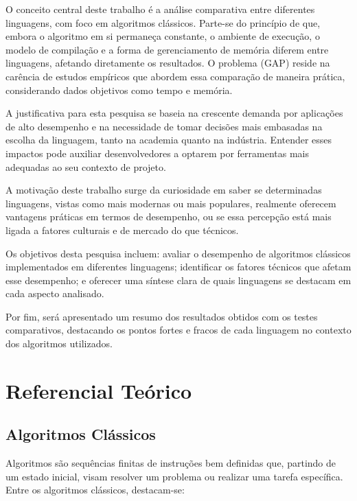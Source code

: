 \documentclass[12pt,oneside,a4paper]{report}
\begin{document}
O conceito central deste trabalho é a análise comparativa entre diferentes linguagens, com foco em algoritmos clássicos. Parte-se do princípio de que, embora o algoritmo em si permaneça constante, o ambiente de execução, o modelo de compilação e a forma de gerenciamento de memória diferem entre linguagens, afetando diretamente os resultados. O problema (GAP) reside na carência de estudos empíricos que abordem essa comparação de maneira prática, considerando dados objetivos como tempo e memória.

A justificativa para esta pesquisa se baseia na crescente demanda por aplicações de alto desempenho e na necessidade de tomar decisões mais embasadas na escolha da linguagem, tanto na academia quanto na indústria. Entender esses impactos pode auxiliar desenvolvedores a optarem por ferramentas mais adequadas ao seu contexto de projeto.

A motivação deste trabalho surge da curiosidade em saber se determinadas linguagens, vistas como mais modernas ou mais populares, realmente oferecem vantagens práticas em termos de desempenho, ou se essa percepção está mais ligada a fatores culturais e de mercado do que técnicos.

Os objetivos desta pesquisa incluem: avaliar o desempenho de algoritmos clássicos implementados em diferentes linguagens; identificar os fatores técnicos que afetam esse desempenho; e oferecer uma síntese clara de quais linguagens se destacam em cada aspecto analisado.

Por fim, será apresentado um resumo dos resultados obtidos com os testes comparativos, destacando os pontos fortes e fracos de cada linguagem no contexto dos algoritmos utilizados.

\chapter{Referencial Teórico}

\section{Algoritmos Clássicos}

Algoritmos são sequências finitas de instruções bem definidas que, partindo de um estado inicial, visam resolver um problema ou realizar uma tarefa específica. Entre os algoritmos clássicos, destacam-se:
\end{document}
